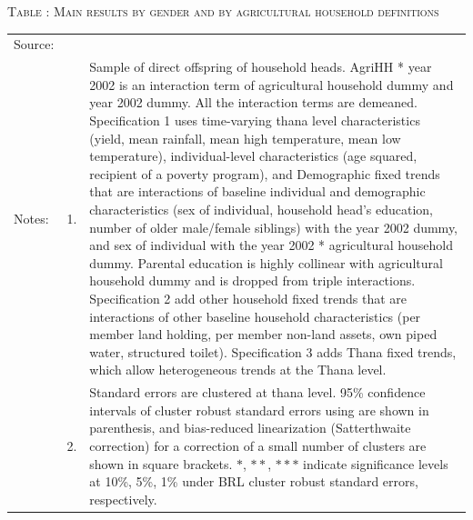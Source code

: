 \documentclass[12pt,letterpaper]{article}
\newcommand{\0}{\ensuremath{\mbox{\boldmath $0$}}}
\begin{document}
{

\pagebreak

\begin{table}
\hfil\textsc{\footnotesize Table \thetable: Main results by gender and by agricultural household definitions\label{MainGenderByAgdefResults}}\\
\setlength{\tabcolsep}{1pt}
\renewcommand{\arraystretch}{.75}
\hspace{-1.0cm}
\renewcommand{\arraystretch}{1}
\hfil\begin{tabular}{>{\hfill\scriptsize}p{1cm}<{}>{\hfill\scriptsize}p{.25cm}<{}>{\scriptsize}p{.7\paperwidth}<{\hfill}}
Source:& \multicolumn{2}{l}{\scriptsize Compiled from IFPRI data. }\\[-1ex]
Notes:& 1. & Sample of direct offspring of household heads. \textsf{AgriHH * year 2002} is an interaction term of agricultural household dummy and year 2002 dummy. All the interaction terms are demeaned. Specification 1 uses time-varying thana level characteristics (yield, mean rainfall, mean high temperature, mean low temperature), individual-level characteristics (age squared, recipient of a poverty program), and \textsf{Demographic fixed trends} that are interactions of baseline individual and demographic characteristics (sex of individual, household head's education, number of older male/female siblings) with the year 2002 dummy, and sex of individual with the year 2002 * agricultural household dummy. Parental education is highly collinear with agricultural household dummy and is dropped from triple interactions. Specification 2 add \textsf{other household fixed trends} that are interactions of other baseline household characteristics (per member land holding, per member non-land assets, own piped water, structured toilet). Specification 3 adds \textsf{Thana fixed trends}, which allow heterogeneous trends at the Thana level. \\[-1ex]
& 2. & Standard errors are clustered at thana level. 95\% confidence intervals of cluster robust standard errors using \cite{liang1986longitudinal} are shown in parenthesis, and bias-reduced linearization (Satterthwaite correction) for a correction of a small number of clusters are shown in square brackets. $*$, $**$, $***$ indicate significance levels at 10\%, 5\%, 1\% under BRL cluster robust standard errors, respectively.\end{tabular}
\end{table}


}
\end{document}
